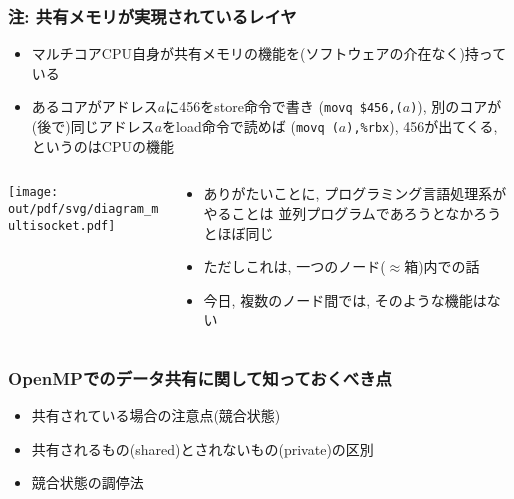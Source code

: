 \documentclass[10pt,dvipdfmx]{beamer}
\newcommand{\ao}[1]{{\color{blue}#1}}
\newcommand{\aka}[1]{{\color{red}#1}}
\begin{document}
\begin{frame}
\frametitle{注: 共有メモリが実現されているレイヤ}
\begin{itemize}
\item マルチコアCPU自身が共有メモリの機能を(ソフトウェアの介在なく)持っている
\item あるコアがアドレス$a$に456をstore命令で書き ({\tt movq \$456,($a$)}),
  別のコアが(後で)同じアドレス$a$をload命令で読めば ({\tt movq ($a$),\%rbx}),
  456が出てくる, というのは\ao{CPUの機能}
\end{itemize}

\begin{columns}
\begin{column}{0.3\textwidth}
\begin{center}
  \texttt{[image: out/pdf/svg/diagram\_multisocket.pdf]}
\end{center}
\end{column}
\begin{column}{0.7\textwidth}
\begin{itemize}
\item ありがたいことに,
  プログラミング言語処理系がやることは
  並列プログラムであろうとなかろうとほぼ同じ
\item ただしこれは, 一つのノード($\approx$箱)内での話
\item 今日, 複数のノード間では, そのような機能はない
\end{itemize}
\end{column}
\end{columns}
\end{frame}

\begin{frame}
  \frametitle{OpenMPでのデータ共有に関して知っておくべき点}
  \begin{itemize}
  \item 共有されている場合の注意点(\aka{競合状態})
  \item 共有されるもの(\ao{shared})とされないもの(\ao{private})の区別
  \item 競合状態の調停法
  \end{itemize}
\end{frame}
\end{document}
